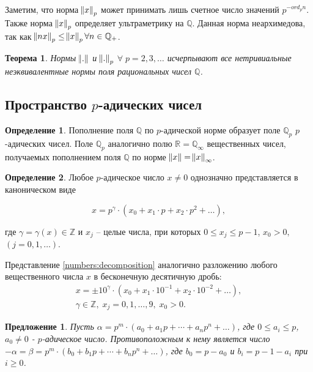 \documentclass[master, och, diploma, times]{sty/SCWorks}
\theoremstyle{plain}
\newtheorem{thethm}{Теорема}[section]
\newtheorem{proposition}{Предложение}[section]
\theoremstyle{definition}
\newtheorem{defn}{Определение}[section]
\numberwithin{equation}{section}
\begin{document}
Заметим, что норма $\norm{x}_p$ может принимать лишь счетное число значений $p ^ {-ord_pn}$. Также норма $\norm{x}_p$ определяет ультраметрику на $\mathbb {Q}$. Данная норма неархимедова, так как $\norm{nx}_p \le \norm{x}_p \forall n \in \mathbb {Q}_{+}$.

\begin{thethm}
	Нормы $\norm{.}$ и $\norm{.}_p$ $\forall \; p = 2, 3, \dots$ исчерпывают все нетривиальные неэквивалентные нормы поля рациональных чисел $\mathbb {Q}$.
\end{thethm}


\subsection{Пространство $p$-адических чисел}

\begin{defn}
Пополнение поля $\mathbb {Q}$ по $p$-адической норме образует поле $\mathbb {Q}_p$ $p$-адических чисел. Поле $\mathbb {Q}_p$ аналогично полю $\mathbb {R} = \mathbb {Q}_{\infty}$ вещественных чисел, получаемых пополнением поля $\mathbb {Q}$ по норме $\norm{x}=\norm{x}_{\infty}$.
\end{defn}


\begin{defn}
Любое $p$-адическое число $x \ne 0$ однозначно представляется в каноническом виде

\begin{equation} \label{numbers:decomposition}
	x = p^{\gamma} \cdot (x_0 + x_1\cdot p + x_2 \cdot p^2 + \dots),
\end{equation}

\noindent где $\gamma = \gamma(x) \in \mathbb {Z}$ и $x_j$ -- целые числа, при которых $0 \le x_j \le p-1$, $x_0 > 0,$ \linebreak $(j=0,1,\dots)$.
\end{defn}

Представление \eqref{numbers:decomposition} аналогично разложению любого вещественного числа $x$ в бесконечную десятичную дробь:
\begin{equation}
\begin{aligned}
	x=\pm10^\gamma \cdot (x_0 + x_1 \cdot 10^{-1} + x_2 \cdot 10^{-2} + \dots),\\
	\gamma \in \mathbb {Z}, \; x_j = 0, 1, \dots, 9, \; x_0 > 0.
\end{aligned}
\end{equation}

\begin{proposition}
Пусть $\alpha=p^m \cdot (a_0+a_1p+\cdots +a_np^n+\dots)$, где $0 \le a_i \le p$, $a_0 \neq 0$ - $p$-адическое число. Противоположным к нему является число \mbox{$- \alpha=\beta=p^m \cdot (b_0+b_1p+\cdots+b_np^n+\dots)$}, где $b_0=p-a_0$ и $b_i=p-1-a_i$ при $i \geq 0$.
\end{proposition}\label{adic:pros:minus}
\end{document}
